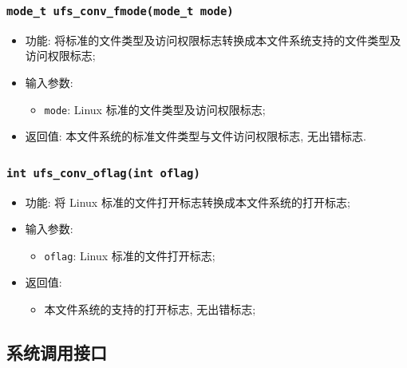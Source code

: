 \documentclass[nofonts]{ctexart}
\begin{document}
  \subsubsection[\texttt{ufs\_conv\_fmode}]{\texttt{mode\_t ufs\_conv\_fmode(mode\_t mode)}}
  \begin{itemize}
\item
  功能:
  将标准的文件类型及访问权限标志转换成本文件系统支持的文件类型及访问权限标志;
\item
  输入参数:

  \begin{itemize}
  \item
    \texttt{mode}: Linux 标准的文件类型及访问权限标志;
  \end{itemize}
\item
  返回值: 本文件系统的标准文件类型与文件访问权限标志, 无出错标志.
  \end{itemize}
  \subsubsection[\texttt{ufs\_conv\_oflag}]{\texttt{int ufs\_conv\_oflag(int oflag)}}
  \begin{itemize}
\item
  功能: 将 Linux 标准的文件打开标志转换成本文件系统的打开标志;
\item
  输入参数:

  \begin{itemize}
  \item
    \texttt{oflag}: Linux 标准的文件打开标志;
  \end{itemize}
\item
  返回值:

  \begin{itemize}
  \item
    本文件系统的支持的打开标志, 无出错标志;
  \end{itemize}
\end{itemize}

\subsection{系统调用接口}\label{ux7cfbux7edfux8c03ux7528ux63a5ux53e3}
\end{document}
